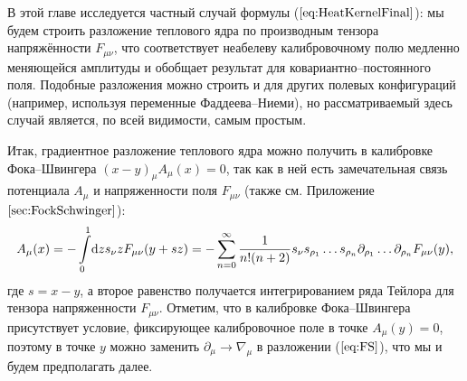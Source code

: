 
В этой главе исследуется частный случай формулы ($\ref{eq:HeatKernelFinal}$): мы будем строить разложение теплового ядра по производным тензора напряжённости $F_{\mu \nu}$, что соответствует неабелеву калибровочному полю медленно меняющейся амплитуды и обобщает результат для ковариантно--постоянного поля. Подобные разложения можно строить и для других полевых конфигураций (например, используя переменные Фаддеева--Ниеми), но рассматриваемый здесь случай является, по всей видимости, самым простым.

Итак, градиентное разложение теплового ядра можно получить в калибровке Фока--Швингера $(x-y)_\mu A_\mu(x)=0$, так как в ней есть замечательная связь потенциала $A_\mu$ и напряженности поля $F_{\mu \nu}$ (также см. Приложение $\ref{sec:FockSchwinger}$):
\begin{equation}
	\label{eq:FS}
	A_\mu(x)=-\int\limits_0^1\!\mathrm{d} z s_\nu z F_{\mu \nu}(y+sz)=-\sum\limits_{n=0}^\infty \frac{1}{n!(n+2)}s_\nu s_{\rho_1}\dots s_{\rho_n}\partial_{\rho_1}\dots\partial_{\rho_n}F_{\mu \nu}(y),
\end{equation}
где $s=x-y$, а второе равенство получается интегрированием ряда Тейлора для тензора напряженности $F_{\mu \nu}$. Отметим, что в калибровке Фока--Швингера присутствует условие, фиксирующее калибровочное поле в точке $A_\mu(y)=0$, поэтому в точке $y$ можно заменить $\partial_\mu \to \nabla_\mu$ в разложении ($\ref{eq:FS}$), что мы и будем предполагать далее.

